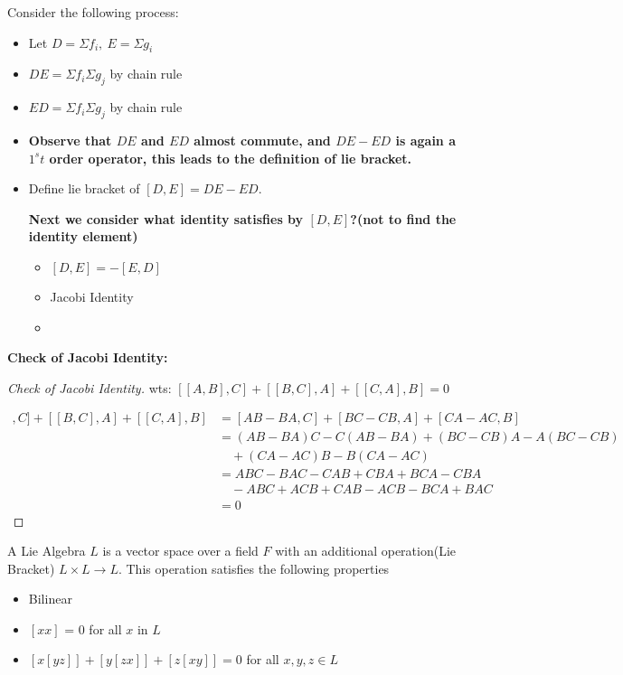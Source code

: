 \documentclass[11pt]{article}
\begin{document}
Consider the following process:
\begin{itemize}
\item Let \(D = \Sigma f_i, \ E = \Sigma g_i\)
\item \(DE = \Sigma f_i \Sigma g_j\) by chain rule
\item \(ED = \Sigma f_i \Sigma g_j\) by chain rule
\item \textbf{Observe that \(DE\) and \(ED\) almost commute, and \(DE - ED\) is again a \(1^st\) order operator, this leads to the definition of lie bracket.}
\item Define lie bracket of \([D,E] = DE - ED\).

\textbf{Next we consider what identity satisfies by \([D,E]\)?(not to find the identity element)}

\begin{itemize}
\item \([D,E] = -[E,D]\)
\item Jacobi Identity
\item 
\end{itemize}
\end{itemize}

\textbf{Check of Jacobi Identity:}
\begin{proof}[Check of Jacobi Identity]
\leavevmode

wts: \([[A,B],C] + [[B,C],A] + [[C,A],B] = 0\)

\begin{align}
[[A,B],C] + [[B,C],A] + [[C,A],B]
&= [AB - BA, C] + [BC - CB, A] + [CA - AC, B] \\
&= (AB - BA)C - C(AB - BA) + (BC - CB)A - A(BC - CB) \nonumber \\
&\quad + (CA - AC)B - B(CA - AC) \\
&= ABC - BAC - CAB + CBA + BCA - CBA \nonumber \\
&\quad - ABC + ACB + CAB - ACB - BCA + BAC \\
&= 0
\end{align}
\end{proof}


\begin{definition}
A Lie Algebra \(L\) is a vector space over a field \(F\) with an additional operation(Lie Bracket) \(L \times L \to L\). This operation satisfies the following properties
\begin{itemize}
\item Bilinear
\item \([xx]\) = 0 for all \(x\) in \(L\)
\item \([x[yz]] + [y[zx]] + [z[xy]] =  0\) for all \(x,y,z \in L\)
\end{itemize}
\end{definition}
\end{document}
